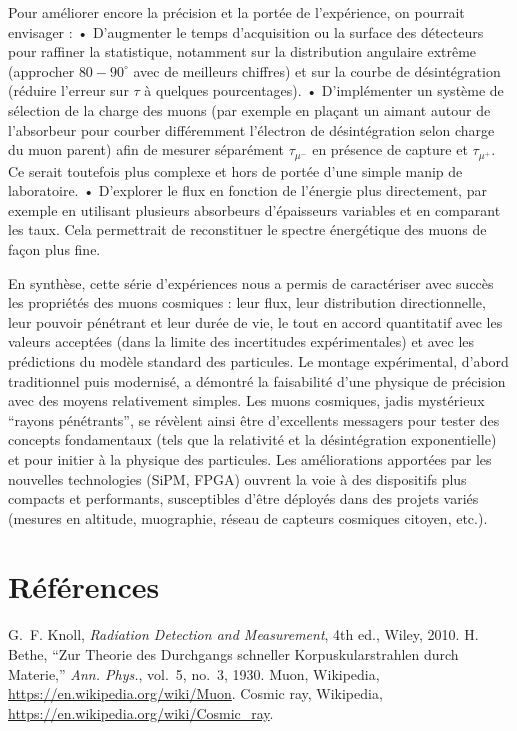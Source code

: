 \documentclass[a4paper,12pt,twoside]{article}
\begin{document}
Pour améliorer encore la précision et la portée de l’expérience, on pourrait envisager :
	•	D’augmenter le temps d’acquisition ou la surface des détecteurs pour raffiner la statistique, notamment sur la distribution angulaire extrême (approcher $80-90^\circ$ avec de meilleurs chiffres) et sur la courbe de désintégration (réduire l’erreur sur $\tau$ à quelques pourcentages).
	•	D’implémenter un système de sélection de la charge des muons (par exemple en plaçant un aimant autour de l’absorbeur pour courber différemment l’électron de désintégration selon charge du muon parent) afin de mesurer séparément $\tau_{\mu^-}$ en présence de capture et $\tau_{\mu^+}$. Ce serait toutefois plus complexe et hors de portée d’une simple manip de laboratoire.
	•	D’explorer le flux en fonction de l’énergie plus directement, par exemple en utilisant plusieurs absorbeurs d’épaisseurs variables et en comparant les taux. Cela permettrait de reconstituer le spectre énergétique des muons de façon plus fine.

En synthèse, cette série d’expériences nous a permis de caractériser avec succès les propriétés des muons cosmiques : leur flux, leur distribution directionnelle, leur pouvoir pénétrant et leur durée de vie, le tout en accord quantitatif avec les valeurs acceptées (dans la limite des incertitudes expérimentales) et avec les prédictions du modèle standard des particules. Le montage expérimental, d’abord traditionnel puis modernisé, a démontré la faisabilité d’une physique de précision avec des moyens relativement simples. Les muons cosmiques, jadis mystérieux “rayons pénétrants”, se révèlent ainsi être d’excellents messagers pour tester des concepts fondamentaux (tels que la relativité et la désintégration exponentielle) et pour initier à la physique des particules. Les améliorations apportées par les nouvelles technologies (SiPM, FPGA) ouvrent la voie à des dispositifs plus compacts et performants, susceptibles d’être déployés dans des projets variés (mesures en altitude, muographie, réseau de capteurs cosmiques citoyen, etc.).

\section*{Références}
\begin{thebibliography}{9}
 G.~F. Knoll, \emph{Radiation Detection and Measurement}, 4th ed., Wiley, 2010.
 H. Bethe, ``Zur Theorie des Durchgangs schneller Korpuskularstrahlen durch Materie,'' \emph{Ann. Phys.}, vol.~5, no.~3, 1930.
 Muon, Wikipedia, \url{https://en.wikipedia.org/wiki/Muon}.
 Cosmic ray, Wikipedia, \url{https://en.wikipedia.org/wiki/Cosmic_ray}.
\end{thebibliography}
\end{document}
